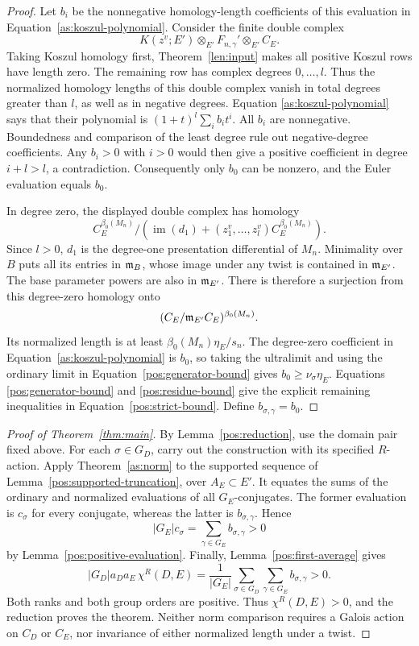 \begin{proof}
Let $b_i$ be the nonnegative homology-length coefficients of
this evaluation in Equation~\eqref{as:koszul-polynomial}.  Consider the
finite double complex
\[
 K(z^v;E')\otimes_{E'}F_{n,\gamma}'
                         \otimes_{E'}C_E.
\]
Taking Koszul homology first, Theorem~\ref{len:input} makes all
positive Koszul rows have length zero.  The remaining row has
complex degrees $0,\ldots,l$.  Thus the normalized homology
lengths of this double complex vanish in total degrees greater
than $l$, as well as in negative degrees.  Equation
\eqref{as:koszul-polynomial} says that their polynomial is
$(1+t)^l\sum_i b_it^i$.  All $b_i$ are nonnegative.  Boundedness
and comparison of the least degree rule out negative-degree
coefficients.  Any $b_i>0$ with $i>0$ would then give a positive
coefficient in degree $i+l>l$, a contradiction.  Consequently
only $b_0$ can be nonzero, and the Euler evaluation equals $b_0$.

In degree zero, the displayed double complex has homology
\[
 C_E^{\beta_0(M_n)}\big/
 \left(\operatorname{im}(d_1)+(z_1^v,\ldots,z_l^v)
                                    C_E^{\beta_0(M_n)}\right).
\]
Since $l>0$, $d_1$ is the degree-one presentation differential
of $M_n$.  Minimality over $B$ puts all its entries in $\mathfrak{m}_B$,
whose image under any twist is contained in $\mathfrak{m}_{E'}$.
The base parameter powers are also in $\mathfrak{m}_{E'}$.  There is
therefore a surjection from this degree-zero homology onto
\[
 (C_E/\mathfrak{m}_{E'}C_E)^{\beta_0(M_n)}.
\]
Its normalized length is at least
$\beta_0(M_n)\eta_E/s_n$.  The degree-zero coefficient in
Equation~\eqref{as:koszul-polynomial} is $b_0$, so taking the ultralimit
and using the ordinary limit in Equation~\eqref{pos:generator-bound}
gives $b_0\ge\nu_\sigma\eta_E$.  Equations
\eqref{pos:generator-bound} and \eqref{pos:residue-bound} give
the explicit remaining inequalities in
Equation~\eqref{pos:strict-bound}.  Define $b_{\sigma,\gamma}=b_0$.
\end{proof}

\begin{proof}[Proof of Theorem~\ref{thm:main}]
By Lemma~\ref{pos:reduction}, use the domain pair fixed above.
For each $\sigma\in G_D$, carry out the construction with its
specified $R$-action.  Apply Theorem~\ref{as:norm} to the supported
sequence of
Lemma~\ref{pos:supported-truncation}, over $A_E\subset E'$.
It equates the sums of the ordinary and normalized evaluations
of all $G_E$-conjugates.  The former evaluation is $c_\sigma$
for every conjugate, whereas the latter is
$b_{\sigma,\gamma}$.  Hence
\begin{equation}\label{pos:second-average}
 |G_E|c_\sigma
       =\sum_{\gamma\in G_E}b_{\sigma,\gamma}>0
\end{equation}
by Lemma~\ref{pos:positive-evaluation}.
Finally, Lemma~\ref{pos:first-average} gives
\[
 |G_D|a_Da_E\,\chi^R(D,E)
    =\frac{1}{|G_E|}
       \sum_{\sigma\in G_D}\sum_{\gamma\in G_E}
                   b_{\sigma,\gamma}>0.
\]
Both ranks and both group orders are positive.  Thus
$\chi^R(D,E)>0$, and the reduction proves the theorem.
Neither norm comparison requires a Galois action on $C_D$ or
$C_E$, nor invariance of either normalized length under a twist.
\end{proof}
